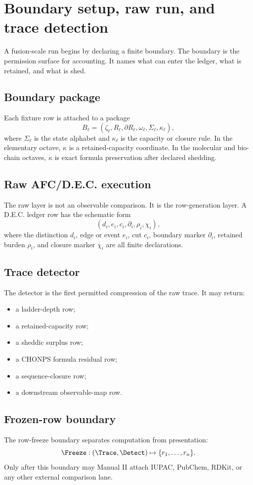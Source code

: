 \section{Boundary setup, raw run, and trace detection}

A fusion-scale run begins by declaring a finite boundary. The boundary is the permission surface for accounting. It names what can enter the ledger, what is retained, and what is shed.

\subsection{Boundary package}

Each fixture row is attached to a package
\[
B_\ell=(\zeta_\ell,R_\ell,\partial R_\ell,\omega_\ell,\Sigma_\ell,\kappa_\ell),
\]
where $\Sigma_\ell$ is the state alphabet and $\kappa_\ell$ is the capacity or closure rule. In the elementary octave, $\kappa$ is a retained-capacity coordinate. In the molecular and bio-chain octaves, $\kappa$ is exact formula preservation after declared shedding.

\subsection{Raw AFC/D.E.C. execution}

The raw layer is not an observable comparison. It is the row-generation layer. A D.E.C. ledger row has the schematic form
\[
(d_i,e_i,c_i,\partial_i,\rho_i,\chi_i),
\]
where the distinction $d_i$, edge or event $e_i$, cut $c_i$, boundary marker $\partial_i$, retained burden $\rho_i$, and closure marker $\chi_i$ are all finite declarations.

\subsection{Trace detector}

The detector is the first permitted compression of the raw trace. It may return:
\begin{itemize}[leftmargin=2em]
  \item a ladder-depth row;
  \item a retained-capacity row;
  \item a sheddic surplus row;
  \item a CHONPS formula residual row;
  \item a sequence-closure row;
  \item a downstream observable-map row.
\end{itemize}


\subsection{Frozen-row boundary}

The row-freeze boundary separates computation from presentation:
\[
\Freeze: (\Trace,\Detect) \mapsto \{r_1,\ldots,r_n\}.
\]
Only after this boundary may Manual II attach IUPAC, PubChem, RDKit, or any other external comparison lane.
